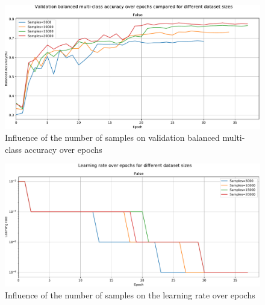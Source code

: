     \begin{figure}[ht]
        \centering
        \includegraphics[width=\textwidth]{figs/densenet201_samples_bma_over_epochs.pdf}
        \caption{Influence of the number of samples on validation balanced multi-class accuracy over epochs}
        \label{fig:samples_bma_over_epochs}
    \end{figure}
    \begin{figure}[ht]
        \centering
        \includegraphics[width=\textwidth]{figs/densenet201_samples_lr_over_epochs.pdf}
        \caption{Influence of the number of samples on the learning rate over epochs}
        \label{fig:samples_lr_over_epochs}
    \end{figure}
    
